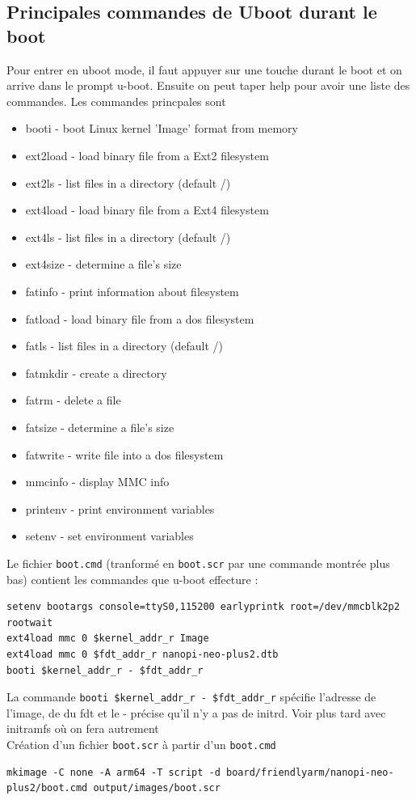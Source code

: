 \subsection{Principales commandes de Uboot durant le boot}
Pour entrer en uboot mode, il faut appuyer sur une touche durant le boot et on arrive dans le prompt u-boot. Ensuite on peut taper help pour avoir une liste des commandes. Les commandes princpales sont
\begin{itemize}
\item booti - boot Linux kernel 'Image' format from memory
\item ext2load  - load binary file from a Ext2 filesystem
\item ext2ls    - list files in a directory (default /)
\item ext4load  - load binary file from a Ext4 filesystem
\item ext4ls    - list files in a directory (default /)
\item ext4size  - determine a file's size
\item fatinfo   - print information about filesystem
\item fatload   - load binary file from a dos filesystem
\item fatls     - list files in a directory (default /)
\item fatmkdir  - create a directory
\item fatrm     - delete a file
\item fatsize   - determine a file's size
\item fatwrite  - write file into a dos filesystem
\item mmcinfo   - display MMC info
\item printenv  - print environment variables
\item setenv    - set environment variables
\end{itemize}
Le fichier \verb!boot.cmd! (tranformé en \verb!boot.scr! par une commande montrée plus bas) contient les commandes que u-boot effecture : 
\begin{Verbatim}[breaklines=true, breakanywhere=true]
setenv bootargs console=ttyS0,115200 earlyprintk root=/dev/mmcblk2p2 rootwait
ext4load mmc 0 $kernel_addr_r Image
ext4load mmc 0 $fdt_addr_r nanopi-neo-plus2.dtb
booti $kernel_addr_r - $fdt_addr_r
\end{Verbatim}
La commande \verb!booti $kernel_addr_r - $fdt_addr_r! spécifie l'adresse de l'image, de du fdt et le - précise qu'il n'y a pas de initrd. Voir plus tard avec initramfs où on fera autrement\\
Création d'un fichier \verb!boot.scr! à partir d'un  \verb!boot.cmd!
\begin{Verbatim}[breaklines=true, breakanywhere=true]
mkimage -C none -A arm64 -T script -d board/friendlyarm/nanopi-neo-plus2/boot.cmd output/images/boot.scr

\end{Verbatim}

